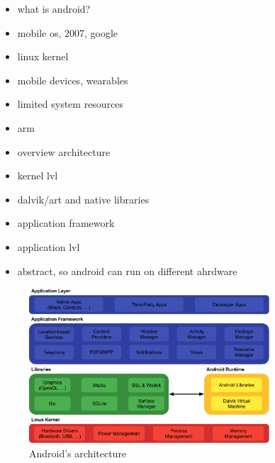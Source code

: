 \begin{itemize}
    \item what is android?
    \item mobile os, 2007, google
    \item linux kernel
    \item mobile devices, wearables
    \item limited system resources
    \item arm
    \item overview architecture
    \item kernel lvl
    \item dalvik/art and native libraries
    \item application framework
    \item application lvl
    \item abstract, so android can run on different ahrdware
\end{itemize}

\begin{figure}[h]
    \centering
    \includegraphics[width=0.8\textwidth]{data/stack.png}
    \caption{Android's architecture \cite{androidStack}}
    \label{fig:androidArchitecture}
\end{figure}

